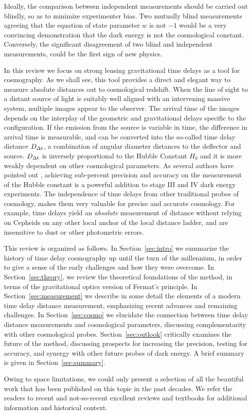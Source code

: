 Ideally, the comparison between independent measurements should be
carried out blindly, so as to minimize experimenter bias. Two mutually
blind measurements agreeing that the equation of state parameter $w$
is not $-1$ would be a very convincing demonstration that the dark
energy is not the cosmological constant. Conversely, the significant
disagreement of two blind and independent measurements, could be the
first sign of new physics.

In this review we focus on strong lensing gravitational time delays as
a tool for cosmography. As we shall see, this tool provides a direct
and elegant way to measure absolute distances out to cosmological
redshift. When the line of sight to a distant source of light is
suitably well aligned with an intervening massive system, multiple
images appear to the observer. The arrival time of the images depends
on the interplay of the geometric and gravitational delays specific to
the configuration. If the emission from the source is variable in
time, the difference in arrival time is measurable, and can be
converted into the so-called time delay distance $D_{\Delta{\rm t}}$, a combination
of angular diameter distances to the deflector and source. $D_{\Delta{\rm t}}$ is
inversely proportional to the Hubble Constant $H_0$ and it is more
weakly dependent on other cosmological parameters. As several authors
have pointed out \citep{Hu05,Lin11,Suy++12,Wei++13}, achieving
sub-percent precision and accuracy on the measurement of the Hubble
constant is a powerful addition to stage III and IV dark energy
experiments. The independence of time delays from other traditional
probes of cosmology, makes them very valuable for precise and accurate
cosmology. For example, time delays yield an {\it absolute}
measurement of distance without relying on Cepheids on any other local
anchor of the local distance ladder, and are insensitive to dust or
other photometric errors.

This review is organized as follows. In Section~\ref{sec:intro} we
summarize the history of time delay cosmography up until the turn of
the millennium, in order to give a sense of the early challenges and
how they were overcome. In Section~\ref{sec:theory}, we review the
theoretical foundations of the method, in terms of the gravitational
optics version of Fermat's principle. In Section~\ref{sec:measurement}
we describe in some detail the elements of a modern time delay
distance measurement, emphasizing recent advances and remaining
challenges. In Section~\ref{sec:cosmo} we elucidate the connection
between time delay distance measurements and cosmological parameters,
discussing complementarity with other cosmological
probes. Section~\ref{sec:outlook} critically examines the future of
the method, discussing prospects for increasing the precision, testing
for accuracy, and synergy with other future probes of dark energy. A
brief summary is given in Section~\ref{sec:summary}.

Owing to space limitations, we could only present a selection of all
the beautiful work that has been published on this topic in the past
decades. We refer the readers to recent
\citep{Bar10,Ell10,Tre10,TMC12,Jackson:2013p30763,Jac15,T+E15} and not-so-recent \citep{B+N92,CSS02,K+S04,Fal05,SKW06}
excellent reviews and textbooks \citep{SEF92} for additional
information and historical context.
